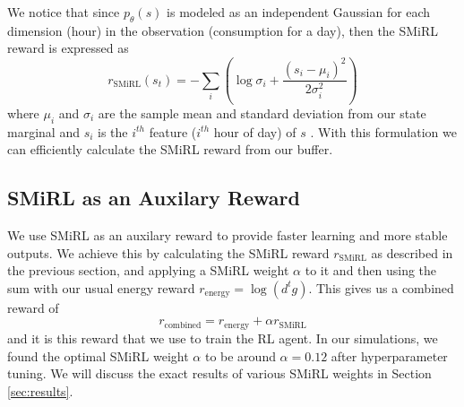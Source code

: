 We notice that since $ p_{\theta}(s) $ is modeled as an independent Gaussian for each dimension (hour) in the observation (consumption for a day), 
then the SMiRL reward is expressed as 
$$ r_{\text{SMiRL}}(s_t) = - \sum\limits_i \left( \log \sigma_i + \frac{(s_i - \mu_i)^2}{2\sigma_i^2} \right)  $$
where $ \mu_i $ and $ \sigma_i$ are the sample mean and standard deviation from our state marginal 
and $ s_i $ is the $ i^{th}$ feature ($ i^{th} $ hour of day) of $ s $ \citep{smirl}.
With this formulation we can efficiently calculate the SMiRL reward from our buffer. 

\subsection{SMiRL as an Auxilary Reward}
We use SMiRL as an auxilary reward to provide faster learning and more stable outputs. 
We achieve this by calculating the SMiRL reward $ r_{\text{SMiRL}} $ as described in the previous section, and applying a SMiRL weight $ \alpha $ to it and then using the sum with our usual energy 
reward $ r_{\text{energy}} = \log(d^tg) $. This gives us a combined reward of 
\begin{equation}
    r_{\text{combined}} = r_{\text{energy}} + \alpha r_{\text{SMiRL}}
\end{equation}
and it is this reward that we use to train the RL agent. 
In our simulations, we found the optimal SMiRL weight $ \alpha $  to be around $ \alpha = 0.12$ after 
hyperparameter tuning. 
We will discuss the exact results of various SMiRL weights in Section \ref{sec:results}. 
